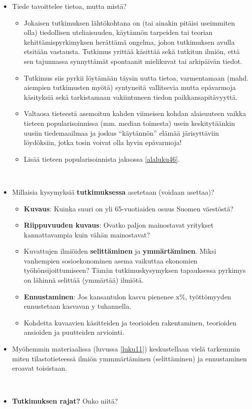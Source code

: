 \documentclass[
]{book}
\providecommand{\tightlist}{%
  \setlength{\itemsep}{0pt}\setlength{\parskip}{0pt}}
\begin{document}
\begin{itemize}
\tightlist
\item
  Tiede tavoittelee tietoa, mutta mistä?

  \begin{itemize}
  \tightlist
  \item
    Jokaisen tutkimuksen lähtökohtana on (tai ainakin pitäisi useimmiten olla) tiedollisen uteliaisuuden, käytännön tarpeiden tai teorian kehittämispyrkimyksen herättämä ongelma, johon tutkimuksen avulla etsitään vastausta. Tutkimus yrittää käsittää sekä tutkitun ilmiön, että sen tajunnassa synnyttämät spontaanit mielikuvat tai arkipäivän tiedot.
  \item
    Tutkimus siis pyrkii löytämään täysin uutta tietoa, varmentamaan (mahd. aiempien tutkimusten myötä) syntyneitä vallitsevia mutta epävarmoja käsityksiä sekä tarkistamaan vakiintuneen tiedon paikkansapitävyyttä.
  \item
    Valtaosa tieteestä asemoituu kahden viimeisen kohdan alaisuuteen vaikka tieteen popularisoinnissa (mm. median toimesta) usein keskitytäänkin uusiin tiedemaailmaa ja joskus ``käytännön'' elämää järisyttäviin löydöksiin, jotka tosin voivat olla hyvin epävarmoja!
  \item
    Lisää tieteen popularisoinnista jaksossa \ref{alaluku46}.\\
    \strut \\
  \end{itemize}
\item
  Millaisia kysymyksiä \textbf{tutkimuksessa} asetetaan (voidaan asettaa)?

  \begin{itemize}
  \tightlist
  \item
    \textbf{Kuvaus}: Kuinka suuri on yli 65-vuotiaiden osuus Suomen väestöstä?
  \item
    \textbf{Riippuvuuden kuvaus}: Ovatko paljon mainostavat yritykset kannattavampia kuin vähän mainostavat?
  \item
    Kuvattujen ilmiöiden \textbf{selittäminen} ja \textbf{ymmärtäminen}. Miksi vanhempien sosioekonominen asema vaikuttaa ekonomien työhönsijoittumiseen? Tämän tutkimuskysymyksen tapauksessa pyrkimys on lähinnä selittää (ymmärtää) ilmiötä.
  \item
    \textbf{Ennustaminen}: Jos kansantulon kasvu pienenee x\%, työttömyyden ennustetaan kasvavan y tuhannella.
  \item
    Kohdetta kuvaavien käsitteiden ja teorioiden rakentaminen, teorioiden ansioiden ja puutteiden arviointi.
  \end{itemize}
\item
  Myöhemmin materiaalissa (luvussa \ref{luku11}) keskustellaan vielä tarkemmin miten tilastotieteessä ilmiön ymmmärtäminen (selittäminen) ja ennustaminen eroavat toisistaan.\\
  \strut \\
\item
  \textbf{Tutkimuksen rajat?} Onko niitä?


\end{itemize}
\end{document}
